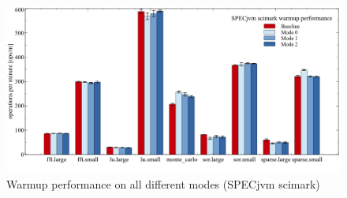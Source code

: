 \begin{figure}[ht!]
  \begin{center}
    \centering
    \includegraphics[width=1.0\textwidth]{figures/scimark_warmup.png}
    \caption{Warmup performance on all different modes (SPECjvm scimark)}
    \label{f:scimark_warmup}
  \end{center}
\end{figure}

